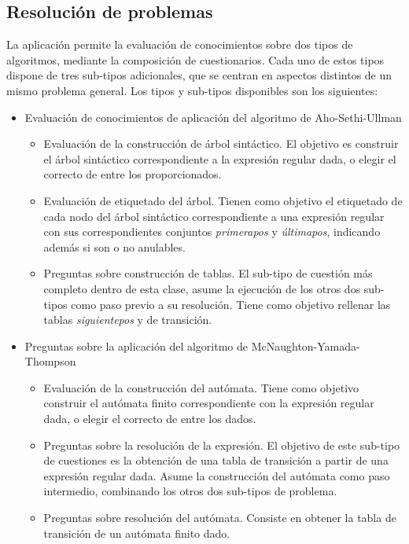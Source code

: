 \subsection{Resolución de problemas}
La aplicación permite la evaluación de conocimientos sobre dos tipos de algoritmos, mediante la composición de cuestionarios.
Cada uno de estos tipos dispone de tres sub-tipos adicionales, que se centran en aspectos distintos de un mismo problema general.
Los tipos y sub-tipos disponibles son los siguientes:
\begin{itemize}
	\item Evaluación de conocimientos de aplicación del algoritmo de Aho-Sethi-Ullman
	\begin{itemize}
		\item Evaluación de la construcción de árbol sintáctico.
		El objetivo es construir el árbol sintáctico correspondiente a la expresión regular dada, o elegir el correcto de entre los proporcionados.
		\item Evaluación de etiquetado del árbol.
		Tienen como objetivo el etiquetado de cada nodo del árbol sintáctico correspondiente a una expresión regular con sus correspondientes conjuntos \emph{primerapos} y \emph{últimapos}, indicando además si son o no anulables.
		\item Preguntas sobre construcción de tablas.
		El sub-tipo de cuestión más completo dentro de esta clase, asume la ejecución de los otros dos sub-tipos como paso previo a su resolución.
		Tiene como objetivo rellenar las tablas \emph{siguientepos} y de transición.
	\end{itemize}
	\item Preguntas sobre la aplicación del algoritmo de McNaughton-Yamada-Thompson
	\begin{itemize}
		\item Evaluación de la construcción del autómata.
		Tiene como objetivo construir el autómata finito correspondiente con la expresión regular dada, o elegir el correcto de entre los dados.
		\item Preguntas sobre la resolución de la expresión.
		El objetivo de este sub-tipo de cuestiones es la obtención de una tabla de transición a partir de una expresión regular dada.
		Asume la construcción del autómata como paso intermedio, combinando los otros dos sub-tipos de problema.
		\item Preguntas sobre resolución del autómata.
		Consiste en obtener la tabla de transición de un autómata finito dado.
	\end{itemize}
\end{itemize}

